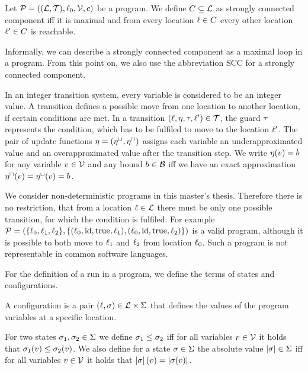 \begin{definition}
  Let $\mathcal{P} = ((\mathcal{L}, \mathcal{T}), \ell_0, \mathcal{V}, c)$ be a program.
  We define $C \subseteq \mathcal{L}$ as strongly connected component iff it is maximal and from every location $\ell \in C$ every other location $\ell' \in C$ is reachable.
\end{definition}

Informally, we can describe a strongly connected component as a maximal loop in a program.
From this point on, we also use the abbreviation SCC for a strongly connected component.

In an integer transition system, every variable is considered to be an integer value.
A transition defines a possible move from one location to another location, if certain conditions are met.
In a transition $(\ell,\eta,\tau,\ell') \in \mathcal{T}$, the guard $\tau$ represents the condition, which has to be fulfiled to move to the location $\ell'$.
The pair of update functions $\eta = (\eta^\sqcup, \eta^\sqcap)$ assigns each variable an underapproximated value and an overapproximated value after the transition step.
We write $\eta(v) = b$ for any variable $v \in \mathcal{V}$ and any bound $b \in \mathcal{B}$ iff we have an exact approximation $\eta^\sqcap(v) = \eta^\sqcup(v) = b$.

We consider non-deterministic programs in this master's thesis.
Therefore there is no restriction, that from a location $\ell \in \mathcal{L}$ there must be only one possible transition, for which the condition is fulfiled.
For example $\mathcal{P} = (\lbrace \ell_0,\ell_1,\ell_2 \rbrace,\lbrace (\ell_0,\text{id},\text{true},\ell_1),(\ell_0,\text{id},\text{true},\ell_2) \rbrace)$ is a valid program, although it is possible to both move to $\ell_1$ and $\ell_2$ from location $\ell_0$.
Such a program is not representable in common software languages.

For the definition of a run in a program, we define the terms of states and configurations.

\begin{definition}[Configuration] 
  A configuration is a pair $(\ell, \sigma) \in \mathcal{L} \times \Sigma$ that defines the values of the program variables at a specific location.
\end{definition}

For two states $\sigma_1, \sigma_2 \in \Sigma$ we define $\sigma_1 \leq \sigma_2$ iff for all variables $v \in \mathcal{V}$ it holds that $\sigma_1(v) \leq \sigma_2(v)$.
We also define for a state $\sigma \in \Sigma$ the absolute value $\left|\sigma\right| \in \Sigma$ iff for all variables $v \in \mathcal{V}$ it holds that $\left|\sigma\right|(v) = \left|\sigma(v)\right|$.

